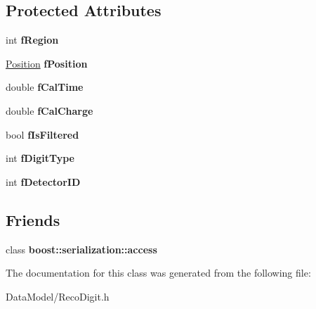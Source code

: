 \subsection*{Protected Attributes}
\begin{DoxyCompactItemize}
\item 
\hypertarget{classRecoDigit_ae74b120795ec48de1d5cea5e4a98adbf}{int {\bfseries f\-Region}}\label{classRecoDigit_ae74b120795ec48de1d5cea5e4a98adbf}

\item 
\hypertarget{classRecoDigit_ab71e3023b350a15c2c38e8e30ced2d1c}{\hyperlink{classPosition}{Position} {\bfseries f\-Position}}\label{classRecoDigit_ab71e3023b350a15c2c38e8e30ced2d1c}

\item 
\hypertarget{classRecoDigit_a776c1d20c30b00592084694d4b83a1b2}{double {\bfseries f\-Cal\-Time}}\label{classRecoDigit_a776c1d20c30b00592084694d4b83a1b2}

\item 
\hypertarget{classRecoDigit_abd1954b7a04f5f13cadb9632aae55a88}{double {\bfseries f\-Cal\-Charge}}\label{classRecoDigit_abd1954b7a04f5f13cadb9632aae55a88}

\item 
\hypertarget{classRecoDigit_a495d492b0bd93ececf36e67640bb18ff}{bool {\bfseries f\-Is\-Filtered}}\label{classRecoDigit_a495d492b0bd93ececf36e67640bb18ff}

\item 
\hypertarget{classRecoDigit_a705e426d69c0160f0529b999f76c36af}{int {\bfseries f\-Digit\-Type}}\label{classRecoDigit_a705e426d69c0160f0529b999f76c36af}

\item 
\hypertarget{classRecoDigit_aa3fb00f02b02329aad2cb1634da5e3e8}{int {\bfseries f\-Detector\-I\-D}}\label{classRecoDigit_aa3fb00f02b02329aad2cb1634da5e3e8}

\end{DoxyCompactItemize}
\subsection*{Friends}
\begin{DoxyCompactItemize}
\item 
\hypertarget{classRecoDigit_ac98d07dd8f7b70e16ccb9a01abf56b9c}{class {\bfseries boost\-::serialization\-::access}}\label{classRecoDigit_ac98d07dd8f7b70e16ccb9a01abf56b9c}

\end{DoxyCompactItemize}


The documentation for this class was generated from the following file\-:\begin{DoxyCompactItemize}
\item 
Data\-Model/Reco\-Digit.\-h\end{DoxyCompactItemize}
